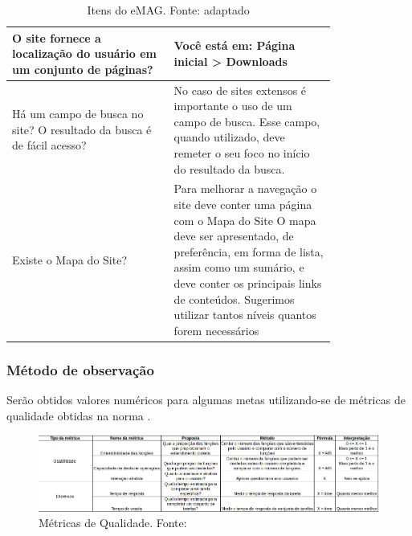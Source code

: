   \begin{table}[!h]
\caption{Itens do eMAG. Fonte: \cite{emag} adaptado}
\centering
\label{tab:emag}
  \begin{tabular}{p{0.40\linewidth}p{0.40\linewidth}}
  \hline
  O site fornece a localização do usuário em um conjunto de páginas? & Você está em: Página inicial > Downloads\\
  \hline
  Há um campo de busca no site? O resultado da busca é de fácil acesso? & No caso de sites extensos é importante o uso de um campo de busca. Esse campo, quando utilizado, deve remeter o seu foco no início do resultado da busca.\\
\hline
Existe o Mapa do Site? & Para melhorar a navegação o site deve conter uma página com o Mapa do Site O mapa deve ser apresentado, de preferência, em forma de lista, assim como um sumário, e deve conter os principais links de conteúdos. Sugerimos utilizar tantos níveis quantos forem necessários\\
 \hline
  \end{tabular}
\end{table}

  
  \subsubsection{Método de observação}
  Serão obtidos valores numéricos para algumas metas utilizando-se de métricas de qualidade obtidas na
  norma .
  
\vfill
\pagebreak
{}
\begin{figure}[!h]
  \centering
    \includegraphics[keepaspectratio=true, scale=0.6, angle=-90]{figuras/qualidade.png}
  \caption{Métricas de Qualidade. Fonte: \cite{iso}}
  \label{fig:metricas}
\end{figure}

\pagebreak

